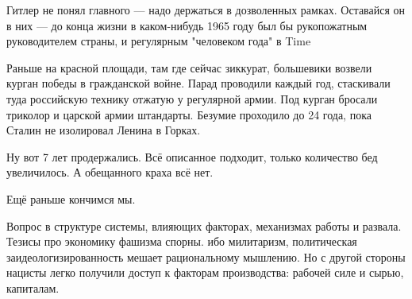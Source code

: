 \begin{itemize}
Гитлер не понял главного — надо держаться в дозволенных рамках. Оставайся он в
них — до конца жизни в каком-нибудь 1965 году был бы рукопожатным руководителем
страны, и регулярным "человеком года" в Time \Smiley[1.0][yellow]

 

Раньше на красной площади, там где сейчас зиккурат, большевики возвели курган
победы в гражданской войне. Парад проводили каждый год, стаскивали туда
российскую технику отжатую у регулярной армии. Под курган бросали триколор и
царской армии штандарты. Безумие проходило до 24 года, пока Сталин не
изолировал Ленина в Горках.


 

Ну вот 7 лет продержались. Всё описанное подходит, только количество бед
увеличилось. А обещанного краха всё нет.

 
Ещё раньше кончимся мы.

 

Вопрос в структуре системы, влияющих факторах, механизмах работы и развала.
Тезисы про экономику фашизма спорны. ибо милитаризм, политическая
заидеологизированность мешает рациональному мышлению. Но с другой стороны
нацисты легко получили доступ к факторам производства: рабочей силе и сырью,
капиталам.

 

\end{itemize}
